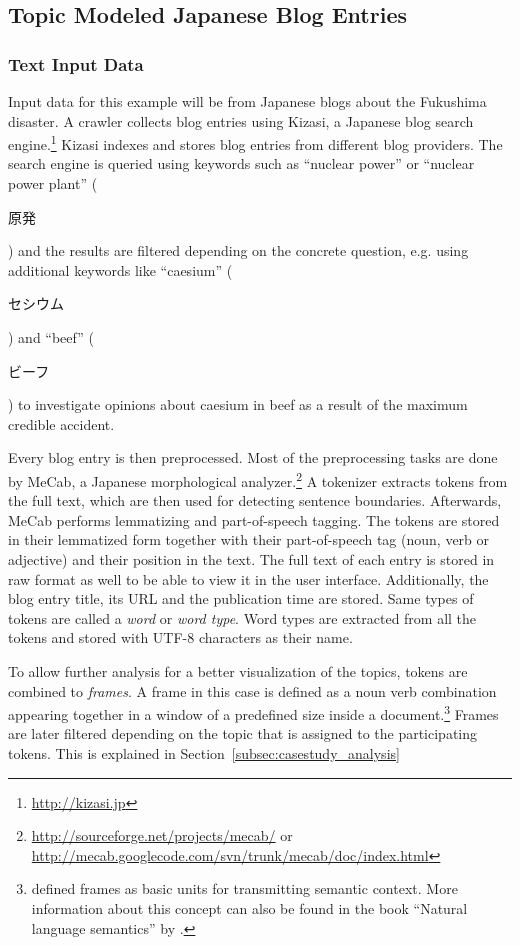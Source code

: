 \subsection{Topic Modeled Japanese Blog Entries}

\subsubsection{Text Input Data}

Input data for this example will be from Japanese blogs about the Fukushima disaster. A crawler collects blog entries using Kizasi, a Japanese blog search engine.\footnote{\url{http://kizasi.jp}} Kizasi indexes and stores blog entries from different blog providers. The search engine is queried using keywords such as ``nuclear power'' or ``nuclear power plant'' (\begin{CJK}{UTF8}{}原発\end{CJK}) and the results are filtered depending on the concrete question, e.g. using additional keywords like ``caesium'' (\begin{CJK}{UTF8}{}セシウム\end{CJK}) and ``beef'' (\begin{CJK}{UTF8}{}ビーフ\end{CJK}) to investigate opinions about caesium in beef as a result of the maximum credible accident.

Every blog entry is then preprocessed. Most of the preprocessing tasks are done by MeCab, a Japanese morphological analyzer.\footnote{\url{http://sourceforge.net/projects/mecab/} or \url{http://mecab.googlecode.com/svn/trunk/mecab/doc/index.html}} A tokenizer extracts tokens from the full text, which are then used for detecting sentence boundaries. Afterwards, MeCab performs lemmatizing and part-of-speech tagging. The tokens are stored in their lemmatized form together with their part-of-speech tag (noun, verb or adjective) and their position in the text. The full text of each entry is stored in raw format as well to be able to view it in the user interface. Additionally, the blog entry title, its URL and the publication time are stored. Same types of tokens are called a \emph{word} or \emph{word type}. Word types are extracted from all the tokens and stored with UTF-8 characters as their name.

To allow further analysis for a better visualization of the topics, tokens are combined to \emph{frames}. A frame in this case is defined as a noun verb combination appearing together in a window of a predefined size inside a document.\footnote{\textcite{minsky1977frame} defined frames as basic units for transmitting semantic context. More information about this concept can also be found in the book ``Natural language semantics'' by \textcite{allan2001natural}.} Frames are later filtered depending on the topic that is assigned to the participating tokens. This is explained in Section~\ref{subsec:casestudy_analysis}

